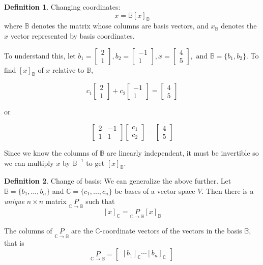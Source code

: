 \documentclass[letterpaper]{article}
\theoremstyle{definition}
\newtheorem{definition}{Definition}[section]
\begin{document}
\begin{definition}{Changing coordinates: }
$$x = \mathbb{B} [x]_{\mathbb{B}}$$
where $\mathbb{B}$ denotes the matrix whose columns are basis vectors, and $x_{\mathbb{B}}$ denotes the $x$ vector represented by basis coordinates. 

To understand this, let $b_1 = \begin{bmatrix}
2 \\
1
\end{bmatrix} , b_2 = \begin{bmatrix}
-1 \\
1
\end{bmatrix} , x = \begin{bmatrix}
4 \\
5
\end{bmatrix} , \text{ and }\mathbb{B} = \{b_1, b_2\}$. To find $[x]_{\mathbb{B}}$ of $x$ relative to $\mathbb{B}$,

$$ c_1 \begin{bmatrix}
2 \\
1
\end{bmatrix} + c_2 \begin{bmatrix}
-1 \\ 
1
\end{bmatrix} = \begin{bmatrix}
4 \\
5
\end{bmatrix}
$$

or

$$ \begin{bmatrix}
2 & -1 \\
1 & 1
\end{bmatrix} 
\begin{bmatrix}
c_1 \\
c_2
\end{bmatrix} 
= \begin{bmatrix}
4 \\
5
\end{bmatrix}
$$ 

Since we know the columns of $\mathbb{B}$ are linearly independent, it must be invertible so we can multiply $x$ by $\mathbb{B}^{-1}$ to get $[x]_{\mathbb{B}}$. 
\end{definition}

\begin{definition}{Change of basis: }
We can generalize the above further. Let $\mathbb{B} = \{ b_1 , ..., b_n \}$ and $\mathbb{C} = \{ c_1 , ..., c_n \}$ be bases of a vector space $V$. Then there is a \textit{unique} $n \times n$ matrix $\underset{\mathbb{C} \rightarrow \mathbb{B}}{P}$ such that
$$[x]_{\mathbb{C}} = \underset{\mathbb{C} \rightarrow \mathbb{B}}{P} [x]_{\mathbb{B}} $$

The columns of $\underset{\mathbb{C} \rightarrow \mathbb{B}}{P}$ are the $\mathbb{C}$-coordinate vectors of the vectors in the basis $\mathbb{B}$, that is
$$ \underset{\mathbb{C} \rightarrow \mathbb{B}}{P} = \begin{bmatrix}
[b_1 ]_{\mathbb{C}} \cdots [b_n]_{\mathbb{C}}
\end{bmatrix}$$

\end{definition}
\end{document}
